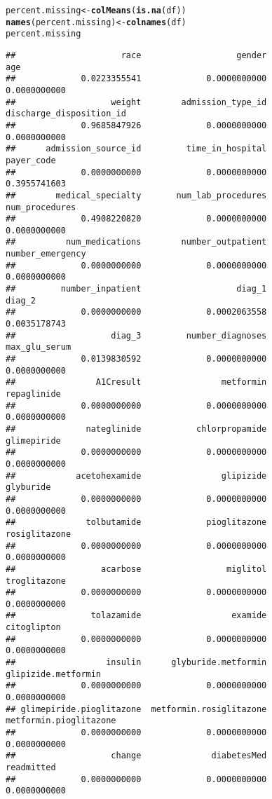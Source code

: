 \documentclass{article}\usepackage[]{graphicx}\usepackage[]{color}
\makeatletter
\newcommand{\hlstd}[1]{\textcolor[rgb]{0.345,0.345,0.345}{#1}}%
\newcommand{\hlkwb}[1]{\textcolor[rgb]{0.69,0.353,0.396}{#1}}%
\newcommand{\hlkwd}[1]{\textcolor[rgb]{0.737,0.353,0.396}{\textbf{#1}}}%
\newenvironment{kframe}{%
 \def\at@end@of@kframe{}%
 \ifinner\ifhmode%
  \def\at@end@of@kframe{\end{minipage}}%
  \begin{minipage}{\columnwidth}%
 \fi\fi%
 \def\FrameCommand##1{\hskip\@totalleftmargin \hskip-\fboxsep
 \colorbox{shadecolor}{##1}\hskip-\fboxsep
     \hskip-\linewidth \hskip-\@totalleftmargin \hskip\columnwidth}%
 \MakeFramed {\advance\hsize-\width
   \@totalleftmargin\z@ \linewidth\hsize
   \@setminipage}}%
 {\par\unskip\endMakeFramed%
 \at@end@of@kframe}
\newenvironment{knitrout}{}{} %
\makeatother
\begin{document}
\begin{knitrout}
\color{fgcolor}\begin{kframe}
\begin{alltt}
\hlstd{percent.missing} \hlkwb{<-} \hlkwd{colMeans}\hlstd{(}\hlkwd{is.na}\hlstd{(df))}
\hlkwd{names}\hlstd{(percent.missing)} \hlkwb{<-} \hlkwd{colnames}\hlstd{(df)}
\hlstd{percent.missing}
\end{alltt}
\begin{verbatim}
##                     race                   gender                      age 
##             0.0223355541             0.0000000000             0.0000000000 
##                   weight        admission_type_id discharge_disposition_id 
##             0.9685847926             0.0000000000             0.0000000000 
##      admission_source_id         time_in_hospital               payer_code 
##             0.0000000000             0.0000000000             0.3955741603 
##        medical_specialty       num_lab_procedures           num_procedures 
##             0.4908220820             0.0000000000             0.0000000000 
##          num_medications        number_outpatient         number_emergency 
##             0.0000000000             0.0000000000             0.0000000000 
##         number_inpatient                   diag_1                   diag_2 
##             0.0000000000             0.0002063558             0.0035178743 
##                   diag_3         number_diagnoses            max_glu_serum 
##             0.0139830592             0.0000000000             0.0000000000 
##                A1Cresult                metformin              repaglinide 
##             0.0000000000             0.0000000000             0.0000000000 
##              nateglinide           chlorpropamide              glimepiride 
##             0.0000000000             0.0000000000             0.0000000000 
##            acetohexamide                glipizide                glyburide 
##             0.0000000000             0.0000000000             0.0000000000 
##              tolbutamide             pioglitazone            rosiglitazone 
##             0.0000000000             0.0000000000             0.0000000000 
##                 acarbose                 miglitol             troglitazone 
##             0.0000000000             0.0000000000             0.0000000000 
##               tolazamide                  examide              citoglipton 
##             0.0000000000             0.0000000000             0.0000000000 
##                  insulin      glyburide.metformin      glipizide.metformin 
##             0.0000000000             0.0000000000             0.0000000000 
## glimepiride.pioglitazone  metformin.rosiglitazone   metformin.pioglitazone 
##             0.0000000000             0.0000000000             0.0000000000 
##                   change              diabetesMed               readmitted 
##             0.0000000000             0.0000000000             0.0000000000
\end{verbatim}
\end{kframe}
\end{knitrout}
\end{document}
